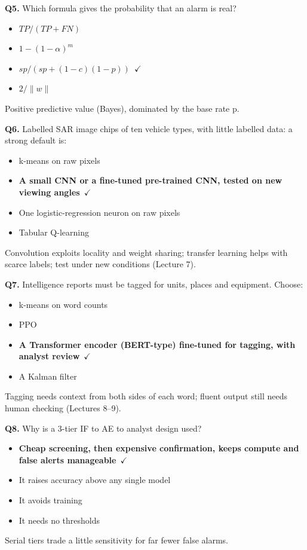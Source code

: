 \documentclass[11pt]{article}
\begin{document}
{\noindent\textbf{Q5.} Which formula gives the probability that an alarm is real?\begin{itemize}[leftmargin=2.2em,itemsep=0pt,topsep=1pt]\item[A.] $TP/(TP+FN)$\item[B.] $1-(1-\alpha)^m$\item[\textbf{C.}] \textbf{$sp/(sp+(1-c)(1-p))$}~{\color{GrnN}$\checkmark$}\item[D.] $2/\|w\|$\end{itemize} Positive predictive value (Bayes), dominated by the base rate p.\par\medskip

\noindent\textbf{Q6.} Labelled SAR image chips of ten vehicle types, with little labelled data: a strong default is:\begin{itemize}[leftmargin=2.2em,itemsep=0pt,topsep=1pt]\item[A.] k-means on raw pixels\item[\textbf{B.}] \textbf{A small CNN or a fine-tuned pre-trained CNN, tested on new viewing angles}~{\color{GrnN}$\checkmark$}\item[C.] One logistic-regression neuron on raw pixels\item[D.] Tabular Q-learning\end{itemize} Convolution exploits locality and weight sharing; transfer learning helps with scarce labels; test under new conditions (Lecture 7).\par\medskip

\noindent\textbf{Q7.} Intelligence reports must be tagged for units, places and equipment. Choose:\begin{itemize}[leftmargin=2.2em,itemsep=0pt,topsep=1pt]\item[A.] k-means on word counts\item[B.] PPO\item[\textbf{C.}] \textbf{A Transformer encoder (BERT-type) fine-tuned for tagging, with analyst review}~{\color{GrnN}$\checkmark$}\item[D.] A Kalman filter\end{itemize} Tagging needs context from both sides of each word; fluent output still needs human checking (Lectures 8--9).\par\medskip

\noindent\textbf{Q8.} Why is a 3-tier IF to AE to analyst design used?\begin{itemize}[leftmargin=2.2em,itemsep=0pt,topsep=1pt]\item[\textbf{A.}] \textbf{Cheap screening, then expensive confirmation, keeps compute and false alerts manageable}~{\color{GrnN}$\checkmark$}\item[B.] It raises accuracy above any single model\item[C.] It avoids training\item[D.] It needs no thresholds\end{itemize} Serial tiers trade a little sensitivity for far fewer false alarms.\par\medskip

}
\end{document}
